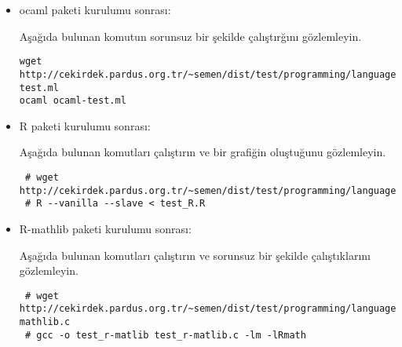 \documentclass[a4paper,10pt]{article}
\begin{document}
\begin{itemize}
\item ocaml paketi kurulumu sonrası:

Aşağıda bulunan komutun sorunsuz bir şekilde çalıştırğını gözlemleyin.
\begin{verbatim}
wget http://cekirdek.pardus.org.tr/~semen/dist/test/programming/language/ocaml-test.ml 
ocaml ocaml-test.ml
\end{verbatim}

 \item R paketi kurulumu sonrası:

Aşağıda bulunan komutları çalıştırın ve bir grafiğin oluştuğunu gözlemleyin.
\begin{verbatim}
 # wget http://cekirdek.pardus.org.tr/~semen/dist/test/programming/language/test_R.R
 # R --vanilla --slave < test_R.R
\end{verbatim}
\item R-mathlib paketi kurulumu sonrası:

Aşağıda bulunan komutları çalıştırın ve sorunsuz bir şekilde çalıştıklarını gözlemleyin.	
\begin{verbatim}
 # wget http://cekirdek.pardus.org.tr/~semen/dist/test/programming/language/test_r-mathlib.c
 # gcc -o test_r-matlib test_r-matlib.c -lm -lRmath
\end{verbatim}
\end{itemize}
\end{document}

